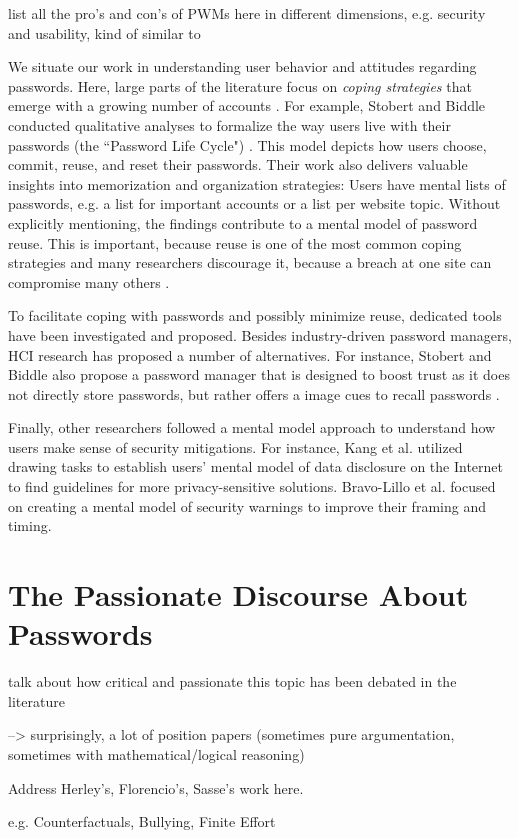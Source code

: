 	list all the pro's and con's of PWMs here in different dimensions, e.g. security and usability, kind of similar to \cite{Bonneau2012ReplacePasswords}
	
	
	
	We situate our work in understanding user behavior and attitudes regarding passwords. Here, large parts of the literature focus on \textit{coping strategies} that emerge with a growing number of accounts \cite{Florencio2007LargeScaleStudyPasswordHabits, Florencio2014PasswordPortfoliosFiniteUser}. For example, Stobert and Biddle conducted qualitative analyses to formalize the way users live with their passwords (the ``Password Life Cycle") \cite{Stobert2014PasswordLifeCycle}. This model depicts how users choose, commit, reuse, and reset their passwords. Their work also delivers valuable insights into memorization and organization strategies: Users have mental lists of passwords, e.g. a list for important accounts or a list per website topic. Without explicitly mentioning, the findings contribute to a mental model of password reuse. This is important, because reuse is one of the most common coping strategies \cite{Das2014TangledWeb, Gaw2006PasswordManagement, Hayashi2011DiaryStudyPWs} and many researchers discourage it, because a breach at one site can compromise many others \cite{Bonneau2012ScienceOfGuessing, Komanduri2011OfPasswordsAndPeople}. 
	
	To facilitate coping with passwords and possibly minimize reuse, dedicated tools have been investigated and proposed. Besides industry-driven password managers, HCI research has proposed a number of alternatives. For instance, Stobert and Biddle also propose a password manager that is designed to boost trust as it does not directly store passwords, but rather offers a image cues to recall passwords \cite{Stobert2014Versipass}. 
	
	Finally, other researchers followed a mental model approach to understand how users make sense of security mitigations. For instance, Kang et al. utilized drawing tasks to establish users' mental model of data disclosure on the Internet \cite{Kang2015MentalModelsDrawing} to find guidelines for more privacy-sensitive solutions. Bravo-Lillo et al. focused on creating a mental model of security warnings \cite{BravoLillo2011WarningsMentalModel} to improve their framing and timing.
	
	
\section{The Passionate Discourse About Passwords}\label{sec:rw:passionate_discourse}
talk about how critical and passionate this topic has been debated in the literature

--> surprisingly, a lot of position papers (sometimes pure argumentation, sometimes with mathematical/logical reasoning) 

Address Herley's, Florencio's, Sasse's work here. 

e.g. Counterfactuals, Bullying, Finite Effort 
